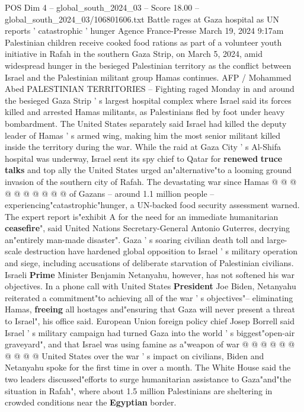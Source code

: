 \begin{textsample}{POS Dim 4 – global\_south\_2024\_03 – Score 18.00 – global\_south\_2024\_03/106801606.txt}  \label{ex:f4_pos_110}
Battle rages at Gaza hospital as UN reports ' catastrophic ' hunger Agence France-Presse March 19, 2024 9:17am Palestinian children receive cooked food rations as part of a volunteer youth initiative in Rafah in the southern Gaza Strip, on March 5, 2024, amid widespread hunger in the besieged Palestinian territory as the conflict between Israel and the Palestinian militant group Hamas continues.
AFP / Mohammed Abed PALESTINIAN TERRITORIES -- Fighting raged Monday in and around the besieged Gaza Strip ' s largest hospital complex where Israel said its forces killed and arrested Hamas militants, as Palestinians fled by foot under heavy bombardment.
The United States separately said Israel had killed the deputy leader of Hamas ' s armed wing, making him the most senior militant killed inside the territory during the war.
While the raid at Gaza City ' s Al-Shifa hospital was underway, Israel sent its spy chief to Qatar for \textbf{renewed} \textbf{truce} \textbf{talks} and top ally the United States urged an"alternative"to a looming ground invasion of the southern city of Rafah.
The devastating war since Hamas @ @ @ @ @ @ @ @ @ @ of Gazans -- around 1.1 million people -- experiencing"catastrophic"hunger, a UN-backed food security assessment warned.
The expert report is"exhibit A for the need for an immediate humanitarian \textbf{ceasefire}", said United Nations Secretary-General Antonio Guterres, decrying an"entirely man-made disaster".
Gaza ' s soaring civilian death toll and large-scale destruction have hardened global opposition to Israel ' s military operation and siege, including accusations of deliberate starvation of Palestinian civilians.
Israeli \textbf{Prime} Minister Benjamin Netanyahu, however, has not softened his war objectives.
In a phone call with United States \textbf{President} Joe Biden, Netanyahu reiterated a commitment"to achieving all of the war ' s objectives"-- eliminating Hamas, \textbf{freeing} all hostages and"ensuring that Gaza will never present a threat to Israel", his office said.
European Union foreign policy chief Josep Borrell said Israel ' s military campaign had turned Gaza into the world ' s biggest"open-air graveyard", and that Israel was using famine as a"weapon of war @ @ @ @ @ @ @ @ @ @ United States over the war ' s impact on civilians, Biden and Netanyahu spoke for the first time in over a month.
The White House said the two leaders discussed"efforts to surge humanitarian assistance to Gaza"and"the situation in Rafah", where about 1.5 million Palestinians are sheltering in crowded conditions near the \textbf{Egyptian} border.

\end{textsample}
